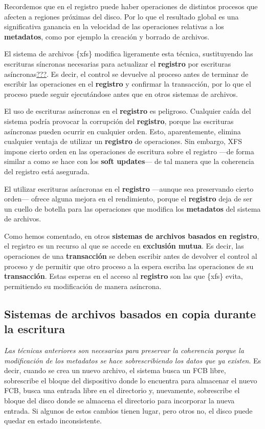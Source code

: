 Recordemos que en el registro puede haber operaciones de distintos
procesos que afecten a regiones próximas del disco. Por lo que el
resultado global es una significativa ganancia en la velocidad de las
operaciones relativas a los \textbf{metadatos}, como por ejemplo la
creación y borrado de archivos.

El sistema de archivos \{xfs\} modifica ligeramente esta técnica,
sustituyendo las escrituras síncronas necesarias para actualizar el
\textbf{registro} por escrituras asíncronas\hyperref[SGI2006]{???}. Es
decir, el control se devuelve al proceso antes de terminar de escribir
las operaciones en el \textbf{registro} y confirmar la transacción, por
lo que el proceso puede seguir ejecutándose antes que en otros sistemas
de archivos.

El uso de escrituras asíncronas en el \textbf{registro} es peligroso.
Cualquier caída del sistema podría provocar la corrupción del
\textbf{registro}, porque las escrituras asíncronas pueden ocurrir en
cualquier orden. Esto, aparentemente, elimina cualquier ventaja de
utilizar un \textbf{registro} de operaciones. Sin embargo, XFS impone
cierto orden en las operaciones de escritura sobre el registro ---de
forma similar a como se hace con los \textbf{soft updates}--- de tal
manera que la coherencia del registro está asegurada.

El utilizar escrituras asíncronas en el \textbf{registro} ---aunque sea
preservando cierto orden--- ofrece alguna mejora en el rendimiento,
porque el \textbf{registro} deja de ser un cuello de botella para las
operaciones que modifica los \textbf{metadatos} del sistema de archivos.

Como hemos comentado, en otros \textbf{sistemas de archivos basados en
registro}, el registro es un recurso al que se accede en
\textbf{exclusión mutua}. Es decir, las operaciones de una
\textbf{transacción} se deben escribir antes de devolver el control al
proceso y de permitir que otro proceso a la espera escriba las
operaciones de su \textbf{transacción}. Estas esperas en el acceso al
\textbf{registro} son las que \{xfs\} evita, permitiendo su modificación
de manera asíncrona.

\subsection{Sistemas de archivos basados en copia durante la
escritura}\label{_sistemas_de_archivos_basados_en_copia_durante_la_escritura}

\emph{Las técnicas anteriores son necesarias para preservar la
coherencia porque la modificación de los metadatos se hace
sobrescribiendo los datos que ya existen}. Es decir, cuando se crea un
nuevo archivo, el sistema busca un FCB libre, sobrescribe el bloque del
dispositivo donde lo encuentra para almacenar el nuevo FCB, busca una
entrada libre en el directorio y, nuevamente, sobrescribe el bloque del
disco donde se almacena el directorio para incorporar la nueva entrada.
Si algunos de estos cambios tienen lugar, pero otros no, el disco puede
quedar en estado inconsistente.

